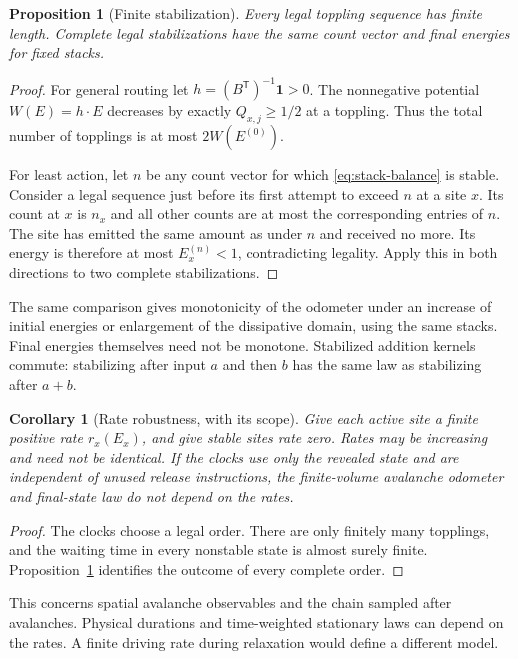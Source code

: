 \documentclass[11pt]{article}
\numberwithin{equation}{section}
\newtheorem{proposition}[theorem]{Proposition}
\newtheorem{corollary}[theorem]{Corollary}
\theoremstyle{definition}
\newcommand{\ind}{\mathbf 1}
\begin{document}
\begin{proposition}[Finite stabilization]\label{prop:finite}
Every legal toppling sequence has finite length. Complete legal stabilizations have the same count vector and final energies for fixed stacks.
\end{proposition}
\begin{proof}
For general routing let $h=(B^{\mathsf T})^{-1}\ind>0$. The nonnegative potential $W(E)=h\cdot E$ decreases by exactly $Q_{x,j}\ge1/2$ at a toppling. Thus the total number of topplings is at most $2W(E^{(0)})$.

For least action, let $n$ be any count vector for which \eqref{eq:stack-balance} is stable. Consider a legal sequence just before its first attempt to exceed $n$ at a site $x$. Its count at $x$ is $n_x$ and all other counts are at most the corresponding entries of $n$. The site has emitted the same amount as under $n$ and received no more. Its energy is therefore at most $E^{(n)}_x<1$, contradicting legality. Apply this in both directions to two complete stabilizations.
\end{proof}

The same comparison gives monotonicity of the odometer under an increase of initial energies or enlargement of the dissipative domain, using the same stacks. Final energies themselves need not be monotone. Stabilized addition kernels commute: stabilizing after input $a$ and then $b$ has the same law as stabilizing after $a+b$.

\begin{corollary}[Rate robustness, with its scope]\label{cor:rates}
Give each active site a finite positive rate $r_x(E_x)$, and give stable sites rate zero. Rates may be increasing and need not be identical. If the clocks use only the revealed state and are independent of unused release instructions, the finite-volume avalanche odometer and final-state law do not depend on the rates.
\end{corollary}
\begin{proof}
The clocks choose a legal order. There are only finitely many topplings, and the waiting time in every nonstable state is almost surely finite. Proposition~\ref{prop:finite} identifies the outcome of every complete order.
\end{proof}
This concerns spatial avalanche observables and the chain sampled after avalanches. Physical durations and time-weighted stationary laws can depend on the rates. A finite driving rate during relaxation would define a different model.
\end{document}
